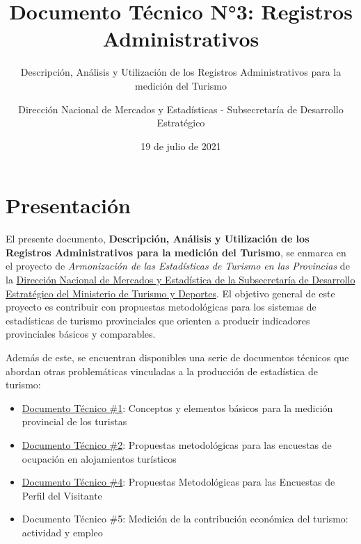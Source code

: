 \documentclass[
]{book}
\title{Documento Técnico N°3: Registros Administrativos}
\subtitle{Descripción, Análisis y Utilización de los Registros Administrativos para la medición del Turismo}
\author{Dirección Nacional de Mercados y Estadísticas - Subsecretaría de Desarrollo Estratégico}
\date{19 de julio de 2021}
\let\oldmaketitle\maketitle
\begin{document}
\maketitle


\newpage

\let\maketitle\oldmaketitle
\maketitle

{
\setcounter{tocdepth}{1}
\tableofcontents
}
\hypertarget{presentaciuxf3n}{%
\chapter*{Presentación}\label{presentaciuxf3n}}

El presente documento, \textbf{Descripción, Análisis y Utilización de los Registros Administrativos para la medición del Turismo}, se enmarca en el proyecto de \emph{Armonización de las Estadísticas de Turismo en las Provincias} de la \href{http://datos.yvera.gob.ar/}{Dirección Nacional de Mercados y Estadística de la Subsecretaría de Desarrollo Estratégico del Ministerio de Turismo y Deportes}. El objetivo general de este proyecto es contribuir con propuestas metodológicas para los sistemas de estadísticas de turismo provinciales que orienten a producir indicadores provinciales básicos y comparables.

Además de este, se encuentran disponibles una serie de documentos técnicos que abordan otras problemáticas vinculadas a la producción de estadística de turismo:

\begin{itemize}
\item
  \href{https://dnme-minturdep.github.io/DT1_medicion_turismo/}{Documento Técnico \#1}: Conceptos y elementos básicos para la medición provincial de los turistas
\item
  \href{https://dnme-minturdep.github.io/DT2_encuestas/}{Documento Técnico \#2}: Propuestas metodológicas para las encuestas de ocupación en alojamientos turísticos
\item
  \href{https://dnme-minturdep.github.io/DT4_perfiles/}{Documento Técnico \#4}: Propuestas Metodológicas para las Encuestas de Perfil del Visitante
\item
  Documento Técnico \#5: Medición de la contribución económica del turismo: actividad y empleo
\end{itemize}
\end{document}
